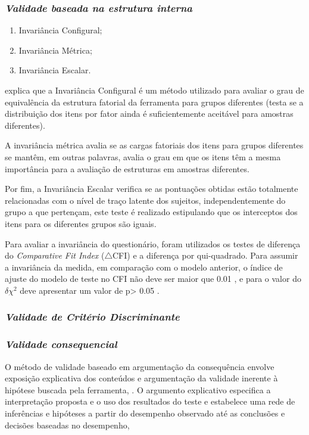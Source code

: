 \subsubsection*{\textit{Validade baseada na estrutura interna}}

\begin{enumerate}
\item Invariância Configural;
\item Invariância Métrica; 
\item Invariância Escalar.
\end{enumerate}


 explica que a Invariância Configural é um método utilizado para avaliar o grau de equivalência da estrutura fatorial da ferramenta para grupos diferentes (testa se a distribuição dos itens por fator ainda é suficientemente aceitável para amostras diferentes).

A invariância métrica avalia se as cargas fatoriais dos itens para grupos diferentes se mantêm, em outras palavras, avalia o grau em que os itens têm a mesma importância para a avaliação de estruturas em amostras diferentes. 

Por fim, a Invariância Escalar verifica se as pontuações obtidas estão totalmente relacionadas com o nível de traço latente dos sujeitos, independentemente do grupo a que pertençam, este teste é realizado estipulando que os interceptos dos itens para os diferentes grupos são iguais.

Para avaliar a invariância do questionário, foram utilizados os testes de diferença do \textit{Comparative Fit Index} ($\triangle$CFI) e a diferença por qui-quadrado. Para assumir a invariância da medida, em comparação com o modelo anterior, o índice de ajuste do modelo de teste no CFI não deve ser maior que 0.01 \cite{Cheung2002EvaluatingInvariance}, e para o valor do $\delta\chi^2$  deve apresentar um valor de p> 0.05 \cite{Milfont2010TestingResearch.}.

\subsubsection*{\textit{Validade de Critério Discriminante}}

\subsubsection*{\textit{Validade consequencial}}

O método de validade baseado em argumentação da consequência envolve exposição explicativa dos conteúdos e argumentação da validade inerente à hipótese buscada pela ferramenta, \cite{Kane2010}. O argumento explicativo especifica a interpretação proposta e o uso dos resultados do teste e estabelece uma rede de inferências e hipóteses a partir do desempenho observado até as conclusões e decisões baseadas no desempenho, 

